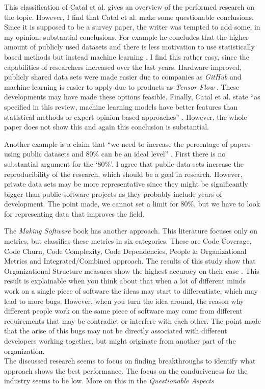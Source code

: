 This classification of Catal et al. gives an overview of the performed research on the topic.
However, I find that Catal et al. make some questionable conclusions.
Since it is supposed to be a survey paper, the writer was tempted to add some, in my opinion, substantial conclusions.
For example he concludes that the higher amount of publicly used datasets \autocite[7349]{Catal20097346}
and there is less motivation to use statistically based methods but instead machine learning \autocite[7350]{Catal20097346}.
I find this rather easy, since the capabilities of researchers increased over the last years.
Hardware improved, publicly shared data sets were made easier due to companies as \textit{GitHub} \autocite{github}
and machine learning is easier to apply due to products as \textit{Tensor Flow} \autocite{abaditensorflow}.
These developments may have made these options feasible.
Finally, Catal et al. state ``as specified in this review, machine learning models have better features than statistical methods or expert opinion based approaches'' \autocite[7351]{Catal20097346}.
However, the whole paper does not show this and again this conclusion is substantial.

Another example is a claim that ``we need to increase the percentage of papers using public datasets and 80\% can be an ideal level'' \autocite[7351]{Catal20097346}.
First there is no substantial argument for the `80\%'. I agree that public data sets increase the reproducibility of the research, which should be a goal in research.
However, private data sets may be more representative since they might be significantly bigger than public software projects as they probably include years of development.
The point made, we cannot set a limit for 80\%, but we have to look for representing data that improves the field.

The \textit{Making Software} \autocite{MAKING_SOFTWARE} book has another approach. This literature focuses only on metrics, but classifies these metrics in six categories.
These are Code Coverage, Code Churn, Code Complexity, Code Dependencies, People \& Organizational Metrics and Integrated/Combined approach.
The results of this study show that Organizational Structure measures show the highest accuracy on their case \autocite[430]{MAKING_SOFTWARE}.
This result is explainable when you think about that when a lot of different minds work on a single piece of software the ideas may start to differentiate, which may lead to more bugs.
However, when you turn the idea around, the reason why different people work on the same piece of software may come from different requirements that may be contradict or interfere with each other.
The point made that the arise of this bugs may not be directly associated with different developers working together, but might originate from another part of the organization.
\\
The discussed research seems to focus on finding breakthroughs to identify what approach shows the best performance.
The focus on the conduciveness for the industry seems to be low. More on this in the \textit{Questionable Aspects}

